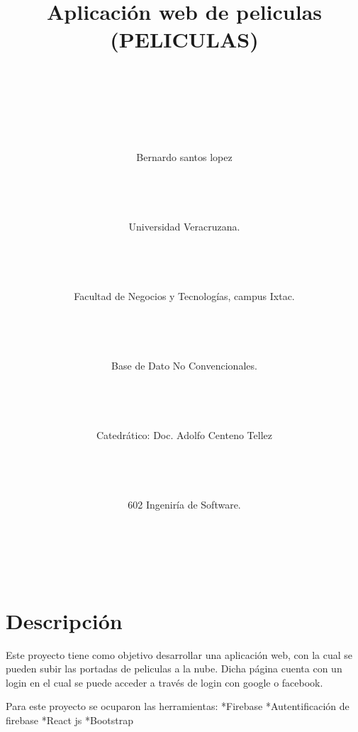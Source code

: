 \documentclass[10pt]{article} %
\title{Aplicación web de peliculas (PELICULAS) \\ \\ \\ \\}
\author{Bernardo santos lopez  \\ \\ \\ \\ \\ Universidad Veracruzana.  \\ \\ \\ \\ \\ Facultad de Negocios y Tecnologías, campus Ixtac.  \\ \\ \\ \\ \\ Base de Dato No Convencionales. \\ \\ \\ \\ \\Catedrático: Doc. Adolfo Centeno Tellez \\ \\ \\ \\ \\
602 Ingeniría de Software. \\ \\ \\ \\ \\ }
\begin{document}
 
\maketitle


 
 
 


\section{Descripción}


Este proyecto tiene como objetivo desarrollar una aplicación web, con la cual se pueden subir las portadas de peliculas a la nube. Dicha página cuenta con un login en el cual se puede acceder a través de login con google o facebook. 

Para este proyecto se ocuparon las herramientas:
*Firebase
*Autentificación de firebase
*React js
*Bootstrap



 

 

 
\end{document}
